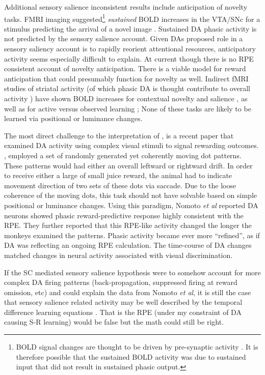 \documentclass[doc]{apa}        %
\begin{document}
Additional sensory salience inconsistent results include anticipation of novelty tasks.  FMRI imaging suggested\footnote{BOLD signal changes are thought to be driven by pre-synaptic activity \cite{Attwell:2002p2730}.  It is therefore possible that the sustained BOLD activity was due to sustained input that did not result in sustained phasic output.} \emph{sustained} BOLD increases in the VTA/SNc for a stimulus predicting the arrival of a novel image \cite{Wittmann:2007p3328}.  Sustained DA phasic activity is not predicted by the sensory salience account.  Given DAs proposed role in a sensory saliency account is to rapidly reorient attentional resources, anticipatory activity seems especially difficult to explain.  At current though there is no RPE consistent account of novelty anticipation. There is a viable model for reward anticipation \cite{Knutson:2007p1687} that could presumably function for novelty as well.  Indirect fMRI studies of striatal activity (of which phasic DA is thought contribute to overall activity \cite{Schonberg:2009p6669,Surmeier:2007p4435}) have shown BOLD increases for contextual novelty and salience  \cite{Zink:2004p5108,GuitartMasip:2010p7227}, as well as for active versus observed learning \cite{Cincotta:2007p6672}; None of these tasks are likely to be learned via positional or luminance changes.

The most direct challenge to the interpretation of , is a recent paper that examined DA activity using complex visual stimuli to signal rewarding outcomes.  , employed a set of randomly generated yet coherently moving dot patterns.  These patterns would had either an overall leftward or rightward drift. In order to receive either a large of small juice reward, the animal had to indicate movement direction of two sets of these dots via saccade.  Due to the loose coherence of the moving dots, this task should not have solvable based on simple positional or luminance changes. Using this paradigm, Nomoto \emph{et al} reported DA neurons showed phasic reward-predictive response highly consistent with the RPE.  They further reported that this RPE-like activity changed the longer the monkeys examined the patterns.  Phasic activity became ever more ``refined'', as if DA was reflecting an ongoing RPE calculation.  The time-course of DA changes matched changes in neural activity associated with visual discrimination.

If the SC mediated sensory salience hypothesis were to somehow account for more complex DA firing patterns (back-propagation, suppressed firing at reward omission, etc) and could explain the data from Nomoto \emph{et al}, it is still the case that sensory salience related activity may be well described by the temporal difference learning equations \cite{ODoherty:2003p6329}.  That is the RPE (under my constraint of DA causing S-R learning) would be false but the math could still be right.
\end{document}
